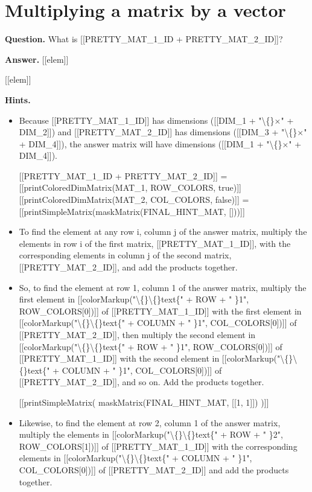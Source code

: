 \documentclass{article}
\begin{document}
\section*{Multiplying a matrix by a vector}
\textbf{Question.} What is [[PRETTY\_MAT\_1\_ID + PRETTY\_MAT\_2\_ID]]?

\textbf{Answer.} [[elem]]
                
                
                    [[elem]]

\textbf{Hints.}
\begin{itemize}
  \item Because [[PRETTY\_MAT\_1\_ID]] has dimensions ([[DIM\_1 + "\textbackslash\{\}$\times$" + DIM\_2]]) and [[PRETTY\_MAT\_2\_ID]] has dimensions ([[DIM\_3 + "\textbackslash\{\}$\times$" + DIM\_4]]), the answer matrix will have dimensions ([[DIM\_1 + "\textbackslash\{\}$\times$" + DIM\_4]]).
            
            
                
                    [[PRETTY\_MAT\_1\_ID + PRETTY\_MAT\_2\_ID]]
                    =
                    [[printColoredDimMatrix(MAT\_1, ROW\_COLORS, true)]]
                    [[printColoredDimMatrix(MAT\_2, COL\_COLORS, false)]]
                    =
                    [[printSimpleMatrix(maskMatrix(FINAL\_HINT\_MAT, []))]]
  \item To find the element at any row i, column j of the answer matrix, multiply the elements in row i of the first matrix, [[PRETTY\_MAT\_1\_ID]], with the corresponding elements in column j of the second matrix, [[PRETTY\_MAT\_2\_ID]], and add the products together.
  \item So, to find the element at row 1, column 1 of the answer matrix, multiply the first element in [[colorMarkup("\textbackslash\{\}\textbackslash\{\}text\{" + ROW + " \}1", ROW\_COLORS[0])]] of [[PRETTY\_MAT\_1\_ID]] with the first element in [[colorMarkup("\textbackslash\{\}\textbackslash\{\}text\{" + COLUMN + " \}1", COL\_COLORS[0])]] of [[PRETTY\_MAT\_2\_ID]], then multiply the second element in [[colorMarkup("\textbackslash\{\}\textbackslash\{\}text\{" + ROW + " \}1", ROW\_COLORS[0])]] of [[PRETTY\_MAT\_1\_ID]] with the second element in [[colorMarkup("\textbackslash\{\}\textbackslash\{\}text\{" + COLUMN + " \}1", COL\_COLORS[0])]] of [[PRETTY\_MAT\_2\_ID]], and so on. Add the products together.
            
            
                
                    [[printSimpleMatrix(
                            maskMatrix(FINAL\_HINT\_MAT, [[1, 1]])
                        )]]
  \item Likewise, to find the element at row 2, column 1 of the answer matrix, multiply the elements in [[colorMarkup("\textbackslash\{\}\textbackslash\{\}text\{" + ROW + " \}2", ROW\_COLORS[1])]] of [[PRETTY\_MAT\_1\_ID]] with the corresponding elements in [[colorMarkup("\textbackslash\{\}\textbackslash\{\}text\{" + COLUMN + " \}1", COL\_COLORS[0])]] of [[PRETTY\_MAT\_2\_ID]] and add the products together.
            

\end{itemize}
\end{document}
